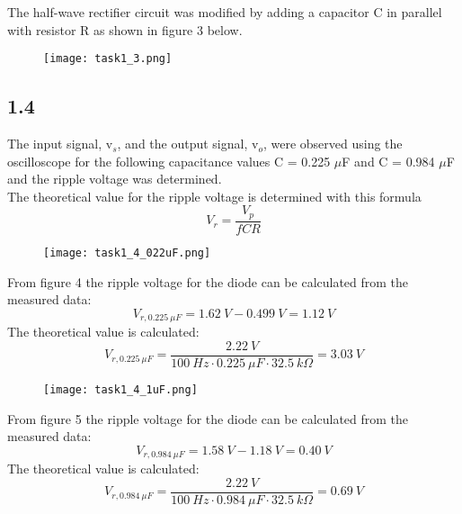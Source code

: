     The half-wave rectifier circuit was modified by adding a capacitor C in parallel with resistor R as shown in figure 3 below.

    \begin{figure}[h!]
        \centering
        \texttt{[image: task1\_3.png]}
    \end{figure}

\subsection*{1.4}
    
    The input signal, v$_s$, and the output signal, v$_o$, were observed using the oscilloscope for the following capacitance values C = 0.225 $\mu$F and C = 0.984 $\mu$F and the ripple voltage was determined.\\
    
    The theoretical value for the ripple voltage is determined with this formula $$ V_r = \dfrac{V_p}{fCR} $$
    
    \begin{figure}[h!]
        \centering
        \texttt{[image: task1\_4\_022uF.png]}
    \end{figure}
    
    From figure 4 the ripple voltage for the diode can be calculated from the measured data: $$ V_{r,0.225 \ \mu F} = 1.62 \ V - 0.499 \ V = 1.12 \ V $$
    The theoretical value is calculated: $$ V_{r,0.225 \ \mu F} = \dfrac{2.22 \ V}{100 \ Hz \cdot 0.225 \ \mu F \cdot 32.5 \ k\Omega} = 3.03 \ V $$

    \begin{figure}[h!]
        \centering
        \texttt{[image: task1\_4\_1uF.png]}
    \end{figure}
    
    From figure 5 the ripple voltage for the diode can be calculated from the measured data: $$V_{r,0.984 \ \mu F} = 1.58 \ V - 1.18 \ V = 0.40 \ V $$
    The theoretical value is calculated: $$ V_{r,0.984 \ \mu F} = \dfrac{2.22 \ V}{100 \ Hz \cdot 0.984 \ \mu F \cdot 32.5 \ k\Omega} = 0.69 \ V $$

